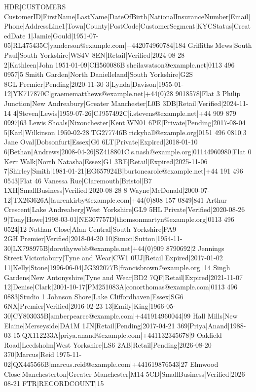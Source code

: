HDR|CUSTOMERS
CustomerID|FirstName|LastName|DateOfBirth|NationalInsuranceNumber|Email|Phone|AddressLine1|Town|County|PostCode|CustomerSegment|KYCStatus|CreatedDate
1|Jamie|Gould|1951-07-05|RL475435C|yanderson@example.com|+442074960784|184 Griffiths Mews|South Paul|South Yorkshire|WS4V 8EN|Retail|Verified|2024-08-28
2|Kathleen|John|1951-01-09|CH560086B|sheilawatson@example.net|0113 496 0957|5 Smith Garden|North Danielleland|South Yorkshire|G2S 8GL|Premier|Pending|2020-11-30
3|Lynda|Davison|1955-01-12|YK717870C|graemematthews@example.net|+44(0)28 9018578|Flat 3 Philip Junction|New Andreabury|Greater Manchester|L0B 3DB|Retail|Verified|2024-11-14
4|Steven|Lewis|1959-07-26|CJ957492C|i.stevens@example.net|+44 909 879 0997|63 Lewis Shoals|Nixonchester|Kent|WN01 6PE|Private|Pending|2017-08-04
5|Karl|Wilkinson|1950-02-28|TG277746B|rickyhall@example.org|0151 496 0810|3 Jane Oval|Dobsonfurt|Essex|G6 6LT|Private|Expired|2018-01-10
6|Bethan|Andrews|2008-04-26|SZ418801C|s.nash@example.org|01144960980|Flat 0 Kerr Walk|North Natasha|Essex|G1 3RE|Retail|Expired|2025-11-06
7|Shirley|Smith|1981-01-21|EG657924B|burtoncarole@example.net|+44 191 496 0543|Flat 46 Vanessa Rue|Claremouth|Bristol|B7 1XH|SmallBusiness|Verified|2020-08-28
8|Wayne|McDonald|2000-07-12|TX263626A|laurenkirby@example.com|+44(0)808 157 0849|841 Arthur Crescent|Lake Andreaberg|West Yorkshire|GL9 5HL|Private|Verified|2020-08-26
9|Tony|Howe|1998-03-01|NE307757D|thomsonmartyn@example.org|0113 496 0524|12 Nathan Close|Alan Central|South Yorkshire|PA9 2GH|Premier|Verified|2018-04-20
10|Simon|Sutton|1954-11-30|LX798975B|dorothywebb@example.net|+44(0)909 8790692|2 Jennings Street|Victoriabury|Tyne and Wear|CW1 0UJ|Retail|Expired|2017-01-02
11|Kelly|Stone|1996-06-04|JG392077B|francisbrown@example.org||14 Singh Gardens|New Antonyshire|Tyne and Wear|BD2 7QF|Retail|Expired|2021-11-07
12|Denise|Clark|2001-10-17|PM251083A|conorthomas@example.com|0113 496 0883|Studio 1 Johnson Shore|Lake Cliffordhaven|Essex|SG6 6NX|Premier|Verified|2016-02-23
13|Emily|King|1966-05-30|CY803035B|amberpearce@example.com|+441914960044|99 Hall Mills|New Elaine|Merseyside|DA1M 1JN|Retail|Pending|2017-04-21
369|Priya|Anand|1988-03-15|QX112233A|priya.anand@example.com|+441132345678|9 Oakfield Road|Leedsholm|West Yorkshire|LS6 2AB|Retail|Pending|2026-08-20
370|Marcus|Reid|1975-11-02|QX445566B|marcus.reid@example.com|+441619876543|27 Elmwood Close|Manchesterton|Greater Manchester|M14 5CD|SmallBusiness|Verified|2026-08-21
FTR|RECORDCOUNT|15
